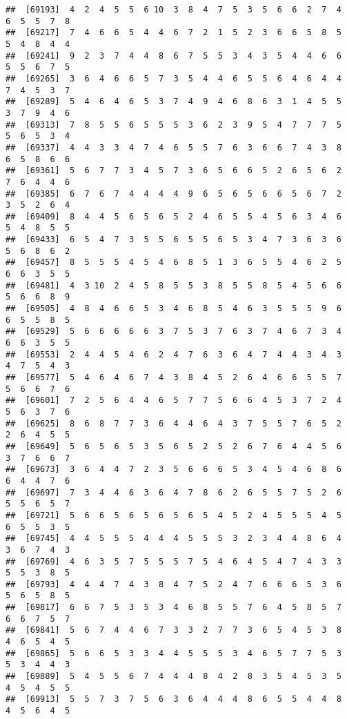 \documentclass[
]{book}
\begin{document}
\begin{verbatim}
##  [69193]  4  2  4  5  5  6 10  3  8  4  7  5  3  5  6  6  2  7  4  6  5  5  7  8
##  [69217]  7  4  6  6  5  4  4  6  7  2  1  5  2  3  6  6  5  8  5  5  4  8  4  4
##  [69241]  9  2  3  7  4  4  8  6  7  5  5  3  4  3  5  4  4  6  6  5  5  6  7  5
##  [69265]  3  6  4  6  6  5  7  3  5  4  4  6  5  5  6  4  6  4  4  7  4  5  3  7
##  [69289]  5  4  6  4  6  5  3  7  4  9  4  6  8  6  3  1  4  5  5  3  7  9  4  6
##  [69313]  7  8  5  5  6  5  5  5  3  6  2  3  9  5  4  7  7  7  5  5  6  5  3  4
##  [69337]  4  4  3  3  4  7  4  6  5  5  7  6  3  6  6  7  4  3  8  6  5  8  6  6
##  [69361]  5  6  7  7  3  4  5  7  3  6  5  6  6  5  2  6  5  6  2  7  6  4  4  6
##  [69385]  6  7  6  7  4  4  4  4  9  6  5  6  5  6  6  5  6  7  2  3  5  2  6  4
##  [69409]  8  4  4  5  6  5  6  5  2  4  6  5  5  4  5  6  3  4  6  5  4  8  5  5
##  [69433]  6  5  4  7  3  5  5  6  5  5  6  5  3  4  7  3  6  3  6  5  6  8  6  2
##  [69457]  8  5  5  5  4  5  4  6  8  5  1  3  6  5  5  4  6  2  5  6  6  3  5  5
##  [69481]  4  3 10  2  4  5  8  5  5  3  8  5  5  8  5  4  5  6  6  5  6  6  8  9
##  [69505]  4  8  4  6  6  5  3  4  6  8  5  4  6  3  5  5  5  9  6  6  5  5  8  5
##  [69529]  5  6  6  6  6  6  3  7  5  3  7  6  3  7  4  6  7  3  4  6  6  3  5  5
##  [69553]  2  4  4  5  4  6  2  4  7  6  3  6  4  7  4  4  3  4  3  4  7  5  4  3
##  [69577]  5  4  6  4  6  7  4  3  8  4  5  2  6  4  6  6  5  5  7  5  6  6  7  6
##  [69601]  7  2  5  6  4  4  6  5  7  7  5  6  6  4  5  3  7  2  4  5  6  3  7  6
##  [69625]  8  6  8  7  7  3  6  4  4  6  4  3  7  5  5  7  6  5  2  2  6  4  5  5
##  [69649]  5  6  5  6  5  3  5  6  5  2  5  2  6  7  6  4  4  5  6  3  7  6  6  7
##  [69673]  3  6  4  4  7  2  3  5  6  6  6  5  3  4  5  4  6  8  6  6  4  4  7  6
##  [69697]  7  3  4  4  6  3  6  4  7  8  6  2  6  5  5  7  5  2  6  5  5  6  5  7
##  [69721]  5  6  6  5  6  5  6  5  6  5  4  5  2  4  5  5  5  4  5  6  5  5  3  5
##  [69745]  4  4  5  5  5  4  4  4  5  5  5  3  2  3  4  4  8  6  4  3  6  7  4  3
##  [69769]  4  6  3  5  7  5  5  5  7  5  4  6  4  5  4  7  4  3  3  5  5  3  8  5
##  [69793]  4  4  4  7  4  3  8  4  7  5  2  4  7  6  6  6  5  3  6  5  6  5  8  5
##  [69817]  6  6  7  5  3  5  3  4  6  8  5  5  7  6  4  5  8  5  7  6  6  7  5  7
##  [69841]  5  6  7  4  4  6  7  3  3  2  7  7  3  6  5  4  5  3  8  4  6  5  4  5
##  [69865]  5  6  6  5  3  3  4  4  5  5  5  3  4  6  5  7  7  5  3  5  3  4  4  3
##  [69889]  5  4  5  5  6  7  4  4  4  8  4  2  8  3  5  4  5  3  5  4  5  4  5  5
##  [69913]  5  5  7  3  7  5  6  3  6  4  4  4  8  6  5  5  4  4  8  4  5  6  4  5

\end{verbatim}
\end{document}
